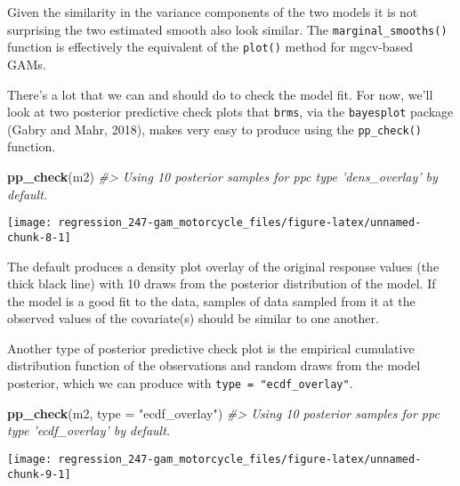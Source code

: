 \documentclass[]{book}
\newenvironment{Shaded}{\begin{snugshade}}{\end{snugshade}}
\newcommand{\CommentTok}[1]{\textcolor[rgb]{0.56,0.35,0.01}{\textit{#1}}}
\newcommand{\DataTypeTok}[1]{\textcolor[rgb]{0.13,0.29,0.53}{#1}}
\newcommand{\KeywordTok}[1]{\textcolor[rgb]{0.13,0.29,0.53}{\textbf{#1}}}
\newcommand{\NormalTok}[1]{#1}
\newcommand{\StringTok}[1]{\textcolor[rgb]{0.31,0.60,0.02}{#1}}
\begin{document}
Given the similarity in the variance components of the two models it is not surprising the two estimated smooth also look similar. The \texttt{marginal\_smooths()} function is effectively the equivalent of the \texttt{plot()} method for mgcv-based GAMs.

There's a lot that we can and should do to check the model fit. For now, we'll look at two posterior predictive check plots that \texttt{brms}, via the \texttt{bayesplot} package (Gabry and Mahr, 2018), makes very easy to produce using the \texttt{pp\_check()} function.\\

\begin{Shaded}
\begin{Highlighting}[]
\KeywordTok{pp_check}\NormalTok{(m2)}
\CommentTok{#> Using 10 posterior samples for ppc type 'dens_overlay' by default.}
\end{Highlighting}
\end{Shaded}

\begin{center}\texttt{[image: regression\_247-gam\_motorcycle\_files/figure-latex/unnamed-chunk-8-1]} \end{center}

The default produces a density plot overlay of the original response values (the thick black line) with 10 draws from the posterior distribution of the model. If the model is a good fit to the data, samples of data sampled from it at the observed values of the covariate(s) should be similar to one another.

Another type of posterior predictive check plot is the empirical cumulative distribution function of the observations and random draws from the model posterior, which we can produce with \texttt{type\ =\ "ecdf\_overlay"}.\\

\begin{Shaded}
\begin{Highlighting}[]
\KeywordTok{pp_check}\NormalTok{(m2, }\DataTypeTok{type =} \StringTok{"ecdf_overlay"}\NormalTok{)}
\CommentTok{#> Using 10 posterior samples for ppc type 'ecdf_overlay' by default.}
\end{Highlighting}
\end{Shaded}

\begin{center}\texttt{[image: regression\_247-gam\_motorcycle\_files/figure-latex/unnamed-chunk-9-1]} \end{center}
\end{document}
